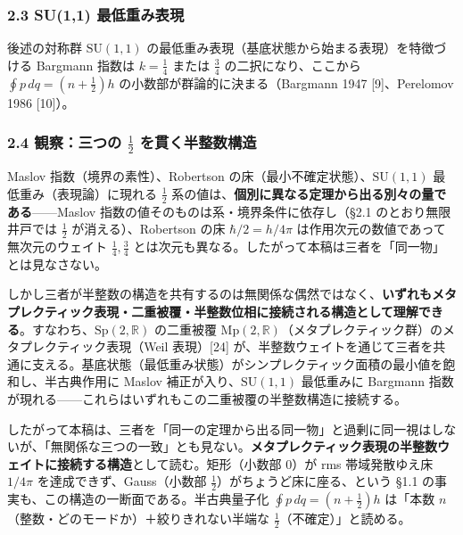 \documentclass[
]{ltjsarticle}
\begin{document}
\subsubsection{2.3 SU(1,1)
最低重み表現}\label{su11-ux6700ux4f4eux91cdux307fux8868ux73fe}

後述の対称群 \(\mathrm{SU}(1,1)\)
の最低重み表現（基底状態から始まる表現）を特徴づける Bargmann 指数は
\(k=\tfrac14\) または \(\tfrac34\) の二択になり、ここから
\(\oint p\,dq=(n+\tfrac12)h\) の小数部が群論的に決まる（Bargmann 1947
{[}9{]}、Perelomov 1986 {[}10{]}）。

\subsubsection{\texorpdfstring{2.4 観察：三つの \(\tfrac12\)
を貫く半整数構造}{2.4 観察：三つの \textbackslash tfrac12 を貫く半整数構造}}\label{ux89b3ux5bdfux4e09ux3064ux306e-tfrac12-ux3092ux8cabux304fux534aux6574ux6570ux69cbux9020}

Maslov 指数（境界の素性）、Robertson
の床（最小不確定状態）、\(\mathrm{SU}(1,1)\) 最低重み（表現論）に現れる
\(\tfrac12\)
系の値は、\textbf{個別に異なる定理から出る別々の量である}------Maslov
指数の値そのものは系・境界条件に依存し（§2.1 のとおり無限井戸では
\(\tfrac12\) が消える）、Robertson の床 \(\hbar/2=h/4\pi\)
は作用次元の数値であって無次元のウェイト \(\tfrac14,\tfrac34\)
とは次元も異なる。したがって本稿は三者を「同一物」とは見なさない。

しかし三者が半整数の構造を共有するのは無関係な偶然ではなく、\textbf{いずれもメタプレクティック表現・二重被覆・半整数位相に接続される構造として理解できる}。すなわち、\(\mathrm{Sp}(2,\mathbb{R})\)
の二重被覆
\(\mathrm{Mp}(2,\mathbb{R})\)（メタプレクティック群）のメタプレクティック表現（Weil
表現）{[}24{]}
が、半整数ウェイトを通じて三者を共通に支える。基底状態（最低重み状態）がシンプレクティック面積の最小値を飽和し、半古典作用に
Maslov 補正が入り、\(\mathrm{SU}(1,1)\) 最低重みに Bargmann
指数が現れる------これらはいずれもこの二重被覆の半整数構造に接続する。

したがって本稿は、三者を「同一の定理から出る同一物」と過剰に同一視はしないが、「無関係な三つの一致」とも見ない。\textbf{メタプレクティック表現の半整数ウェイトに接続する構造}として読む。矩形（小数部
\(0\)）が rms 帯域発散ゆえ床 \(1/4\pi\) を達成できず、Gauss（小数部
\(\tfrac12\)）がちょうど床に座る、という §1.1
の事実も、この構造の一断面である。半古典量子化
\(\oint p\,dq=(n+\tfrac12)h\) は「本数
\(n\)（整数・どのモードか）＋絞りきれない半端な
\(\tfrac12\)（不確定）」と読める。
\end{document}
